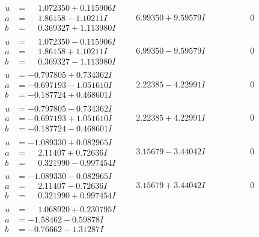\documentclass[1p]{elsarticle_modified}
\theoremstyle{definition}
\begin{document}
$$\begin{array}{c|c|c}
\begin{aligned}
u &= \phantom{-}1.072350 + 0.115906 I \\
a &= \phantom{-}1.86158 - 1.10211 I \\
b &= \phantom{-}0.369327 + 1.113980 I\end{aligned}
 & \phantom{-}6.99350 + 9.59579 I & \phantom{-0.000000 } 0 \\ \hline\begin{aligned}
u &= \phantom{-}1.072350 - 0.115906 I \\
a &= \phantom{-}1.86158 + 1.10211 I \\
b &= \phantom{-}0.369327 - 1.113980 I\end{aligned}
 & \phantom{-}6.99350 - 9.59579 I & \phantom{-0.000000 } 0 \\ \hline\begin{aligned}
u &= -0.797805 + 0.734362 I \\
a &= -0.697193 - 1.051610 I \\
b &= -0.187724 + 0.468601 I\end{aligned}
 & \phantom{-}2.22385 - 4.22991 I & \phantom{-0.000000 } 0 \\ \hline\begin{aligned}
u &= -0.797805 - 0.734362 I \\
a &= -0.697193 + 1.051610 I \\
b &= -0.187724 - 0.468601 I\end{aligned}
 & \phantom{-}2.22385 + 4.22991 I & \phantom{-0.000000 } 0 \\ \hline\begin{aligned}
u &= -1.089330 + 0.082965 I \\
a &= \phantom{-}2.11407 + 0.72636 I \\
b &= \phantom{-}0.321990 - 0.997454 I\end{aligned}
 & \phantom{-}3.15679 - 3.44042 I & \phantom{-0.000000 } 0 \\ \hline\begin{aligned}
u &= -1.089330 - 0.082965 I \\
a &= \phantom{-}2.11407 - 0.72636 I \\
b &= \phantom{-}0.321990 + 0.997454 I\end{aligned}
 & \phantom{-}3.15679 + 3.44042 I & \phantom{-0.000000 } 0 \\ \hline\begin{aligned}
u &= \phantom{-}1.068920 + 0.230795 I \\
a &= -1.58462 - 0.59878 I \\
b &= -0.76662 - 1.31287 I\end{aligned}

\end{array}$$
\end{document}
